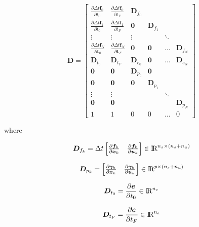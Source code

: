 \documentclass[12pt]{article}
\newcommand{\real}{\mbox{\rm I$\!$R}}
\begin{document}
\begin{equation} \label{mat:D_computation}
\bm{D}=\begin{bmatrix}
\frac{\partial \Delta t \bm{f}_0}{\partial t_0} & \frac{\partial \Delta t \bm{f}_0}{\partial t_F} & \bm{D}_{f_0} &  &  & \\ 
\frac{\partial \Delta t \bm{f}_1}{\partial t_0} & \frac{\partial  \Delta t\bm{f}_1}{\partial t_F} & \bm{0} & \bm{D}_{f_1} &  & \\ 
\vdots  & \vdots  & \vdots & & \ddots& \\ 
\frac{\partial \Delta t \bm{f}_N}{\partial \bm{t}_0} & \frac{\partial \Delta t \bm{f}_N}{\partial \bm{t}_F} & \bm{0} & \bm{0} & \hdots & \bm{D}_{f_N}\\ 
\bm{D}_{t_0} & \bm{D}_{t_F} &  \bm{D}_{e_0}& \bm{0} & \hdots &\bm{D}_{e_N} \\ 
\bm{0} & \bm{0} & \bm{D}_{p_0} & \bm{0} &  & \\ 
\bm{0} & \bm{0} & \bm{0} &\bm{D}_{p_1}  &  & \\ 
\vdots& \vdots  &  & &  \ddots& \\ 
 \bm{0}& \bm{0} &  & &  &\bm{D}_{p_N} \\ 
 1&1 & 0 & 0 & \hdots & 0 
\end{bmatrix}
\end{equation}

\noindent where

\begin{equation}
    \bm{D}_{f_k}=\Delta t 
    \begin{bmatrix}
     \frac{\partial \bm{f}_k}{\partial \bm{x}_k} & \frac{\partial \bm{f}_k}{\partial \bm{u}_k} 
    \end{bmatrix} \in \real^{n_s \times (n_s+n_u)}
\end{equation}

\begin{equation}
    \bm{D}_{p_k}= 
    \begin{bmatrix}
     \frac{\partial \bm{\gamma}_k}{\partial \bm{x}_k} & \frac{\partial \bm{\gamma}_k}{\partial \bm{u}_k} 
    \end{bmatrix} \in \real^{p \times (n_s+n_u)}
\end{equation}

\begin{equation}
    \bm{D}_{t_0}=\frac{\partial \bm{e}}{\partial t_0}  \in \real^{n_e}
\end{equation}

\begin{equation}
    \bm{D}_{t_F}=\frac{\partial \bm{e}}{\partial t_F}  \in \real^{n_e}
\end{equation}
\end{document}
